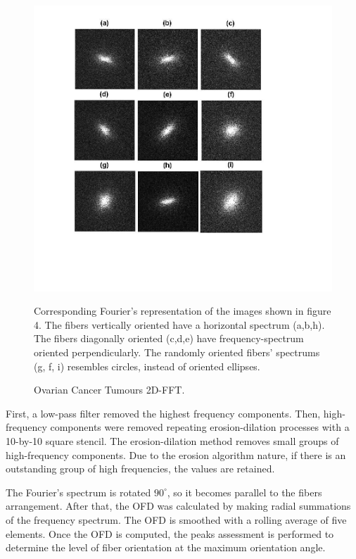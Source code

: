 \documentclass[12pt,a4paper]{article}
\begin{document}
\begin{figure}
  \includegraphics[width=\linewidth]{FiguresDisertation/figure5.jpg}
  \caption{Ovarian Cancer Tumours 2D-FFT. }
  \medskip
  \small
  Corresponding Fourier's representation of the images shown in figure 4. The fibers vertically oriented have a horizontal spectrum (a,b,h). The fibers diagonally oriented (c,d,e) have frequency-spectrum oriented perpendicularly. The randomly oriented fibers' spectrums (g, f, i) resembles circles, instead of oriented ellipses.
  
\end{figure}

First, a low-pass filter removed the highest frequency components. Then, high-frequency components were removed repeating erosion-dilation processes with a 10-by-10 square stencil. The erosion-dilation method removes small groups of high-frequency components. Due to the erosion algorithm nature, if there is an outstanding group of high frequencies, the values are retained.

The Fourier's spectrum is rotated $90^{\circ}$, so it becomes parallel to the  fibers arrangement. After that, the OFD was calculated by making radial summations of the frequency spectrum. The OFD is smoothed with a rolling average of five elements. Once the OFD is computed, the peaks assessment is performed to determine the level of fiber orientation at the maximum orientation angle.
\end{document}
